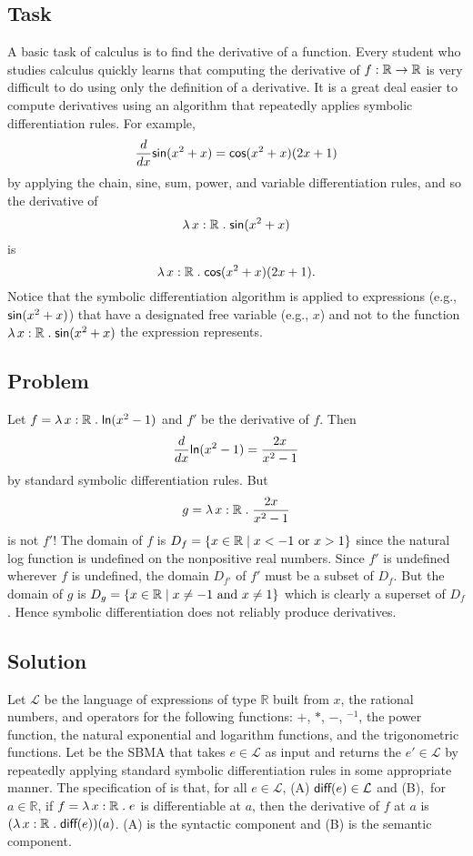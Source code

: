 \documentclass[fleqn]{llncs}
\newcommand{\RR}{\ensuremath{\mathbb{R}}}
\newcommand{\Lang}{\ensuremath{\mathcal{L}}}
\begin{document}
\subsection{Task}

A basic task of calculus is to find the derivative of a function.
Every student who studies calculus quickly learns that computing the
derivative of $f : \RR \tarrow \RR$ is very difficult to do using only
the definition of a derivative.  It is a great deal easier to compute
derivatives using an algorithm that repeatedly applies symbolic
differentiation rules.  For example, \[\frac{d}{dx}\mbox{\sf sin}(x^2 +
x) = \mbox{\sf cos}(x^2 + x)(2x + 1)\] by applying the chain, sine, sum,
power, and variable differentiation rules, and so the derivative of
\[\LambdaApp x : \RR \mdot \mname{sin}(x^2 + x)\] is \[\LambdaApp x :
\RR \mdot \mname{cos}(x^2 + x)(2x + 1).\] Notice that the symbolic
differentiation algorithm is applied to expressions (e.g.,
$\mbox{\sf sin}(x^2 + x)$) that have a designated free variable (e.g.,
$x$) and not to the function $\LambdaApp x : \RR \mdot
\mname{sin}(x^2 + x)$ the expression represents.

\subsection{Problem}

Let $f = \LambdaApp x : \RR \mdot \mname{ln}(x^2 - 1)$ and $f'$ be the
derivative of $f$.  Then \[\frac{d}{dx}\mbox{\sf ln}(x^2 - 1) =
\frac{2x}{x^2-1}\] by standard symbolic differentiation rules.
But \[g = \LambdaApp x : \RR \mdot \frac{2x}{x^2-1}\] is not $f'$!
The domain of $f$ is $D_f = \set{x \in \RR \mid x < -1 \text{ or } x >
  1}$ since the natural log function  is undefined on the
nonpositive real numbers.  Since $f'$ is undefined wherever $f$ is
undefined, the domain $D_{f'}$ of $f'$ must be a subset of $D_f$.  But
the domain of $g$ is $D_g = \set{x \in \RR \mid x \not= -1 \text{ and
  } x \not= 1}$ which is clearly a superset of $D_f$.  Hence symbolic
differentiation does not reliably produce derivatives.

\subsection{Solution}

Let {\Lang} be the language of expressions of type $\RR$ built from
$x$, the rational numbers, and operators for the following functions:
$+$, $*$, $-$, $\phantom{}^{-1}$, the power function, the natural
exponential and logarithm functions, and the trigonometric functions.
Let  be the SBMA that takes $e \in \Lang$ as input and
returns the $e' \in \Lang$ by repeatedly applying standard symbolic
differentiation rules in some appropriate manner.  The specification
of  is that, for all $e \in \Lang$, (A) $\mname{diff}(e)
\in \Lang$ and (B),~for $a \in \RR$, if $f = \LambdaApp x : \RR \mdot
e$ is differentiable at $a$, then the derivative of $f$ at $a$ is
$(\LambdaApp x : \RR \mdot \mname{diff}(e))(a)$.  (A) is the syntactic
component and (B) is the semantic component.
\end{document}
